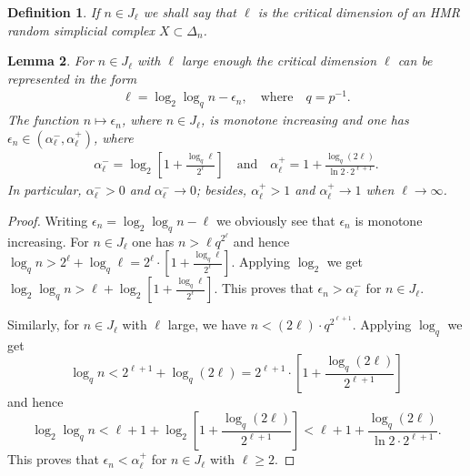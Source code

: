 \documentclass[10pt,a4paper]{amsart}
\newtheorem{lema}{Lemma}
\newtheorem{corollary}[lema]{Corollary}
\newtheorem{definition}[lema]{Definition}
\begin{document}
\begin{definition}
If $n\in J_\ell$ we shall say that $\ell$ is {\it the critical dimension} of an HMR random simplicial complex $X\subset \Delta_n$. 
\end{definition}


\begin{lema}\label{lm:22}
For $n\in J_\ell$ with $\ell$ large enough the critical dimension $\ell$ can be represented in the form 
\begin{eqnarray}\label{eq:19b}
\ell=\log_2\log_q n  -\epsilon_n, \quad \mbox{where}\quad q=p^{-1}.\end{eqnarray} 
The function $n\mapsto \epsilon_n$, where $n\in J_\ell$, is monotone increasing and one has 
$\epsilon_n\in (\alpha_\ell^-,\alpha_\ell^+)$, where 
\begin{eqnarray*}
\alpha_\ell^-=\log_2\left[1+\frac{\log_q\ell}{2^\ell}\right]\quad \mbox{and}\quad 
\alpha_\ell^+ = 1+ \frac{\log_q(2\ell)}{\ln 2 \cdot 2^{\ell+1}}.
\end{eqnarray*}
In particular, $\alpha^-_\ell>0$ and $\alpha^-_\ell\to 0$; besides, 
$\alpha^+_\ell>1$ and $\alpha^+_\ell\to 1$ when $\ell\to \infty$. 
\end{lema}
\begin{proof} Writing $\epsilon_n=\log_2\log_qn-\ell$ we obviously see that $\epsilon_n$ is monotone increasing. For $n\in J_\ell$ one has $n>\ell q^{2^{\ell}}$
and hence $\log_qn >2^\ell+ \log_q\ell= 2^\ell\cdot \left[1+\frac{\log_q\ell}{2^\ell}\right]$. Applying $\log_2$ we get 
$\log_2\log_qn>\ell +\log_2\left[1+\frac{\log_q\ell}{2^\ell}\right]$. This proves that $\epsilon_n>\alpha_\ell^-$ for $n\in J_\ell$. 

Similarly, for $n\in J_\ell$ with $\ell$ large,
we have $n<(2\ell)\cdot q^{2^{\ell+1}}$. Applying $\log_q$ we get 
$$
\log_q n<2^{\ell+1} +\log_q(2\ell)= 2^{\ell+1}\cdot \left[1+ \frac{\log_q(2\ell)}{2^{\ell+1}}\right]
$$
and hence
$$
\log_2\log_q n < \ell+1 + \log_2\left[1+ \frac{\log_q(2\ell)}{2^{\ell+1}}\right] < \ell+1 +\frac{\log_q(2\ell)}{\ln 2\cdot 2^{\ell+1}}.
$$
This proves that $\epsilon_n<\alpha_\ell^+$ for $n\in J_\ell$ with $\ell\ge 2$. 
\end{proof}
%
%
%
%
\end{document}
